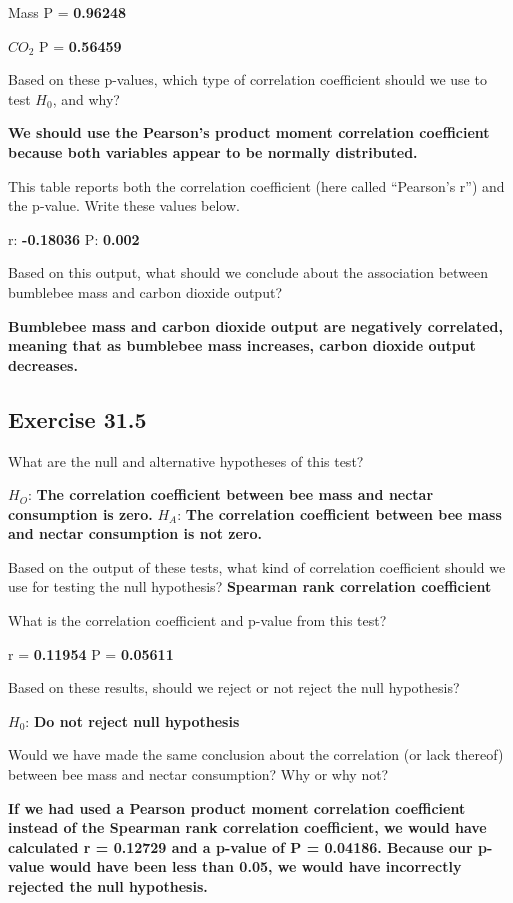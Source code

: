 \documentclass[
  openany]{scrbook}
\begin{document}
Mass P = \textbf{0.96248}

\(CO_2\) P = \textbf{0.56459}

Based on these p-values, which type of correlation coefficient should we use to test \(H_{0}\), and why?

\textbf{We should use the Pearson's product moment correlation coefficient because both variables appear to be normally distributed.}

This table reports both the correlation coefficient (here called ``Pearson's r'') and the p-value. Write these values below.

r: \textbf{-0.18036}
P: \textbf{0.002}

Based on this output, what should we conclude about the association between bumblebee mass and carbon dioxide output?

\textbf{Bumblebee mass and carbon dioxide output are negatively correlated, meaning that as bumblebee mass increases, carbon dioxide output decreases.}

\hypertarget{exercise-31.5}{%
\subsection{Exercise 31.5}\label{exercise-31.5}}

What are the null and alternative hypotheses of this test?

\(H_{O}\): \textbf{The correlation coefficient between bee mass and nectar consumption is zero.}
\(H_{A}\): \textbf{The correlation coefficient between bee mass and nectar consumption is not zero.}

Based on the output of these tests, what kind of correlation coefficient should we use for testing the null hypothesis? \textbf{Spearman rank correlation coefficient}

What is the correlation coefficient and p-value from this test?

r = \textbf{0.11954}
P = \textbf{0.05611}

Based on these results, should we reject or not reject the null hypothesis?

\(H_{0}\): \textbf{Do not reject null hypothesis}

Would we have made the same conclusion about the correlation (or lack thereof) between bee mass and nectar consumption? Why or why not?

\textbf{If we had used a Pearson product moment correlation coefficient instead of the Spearman rank correlation coefficient, we would have calculated r = 0.12729 and a p-value of P = 0.04186. Because our p-value would have been less than 0.05, we would have incorrectly rejected the null hypothesis.}
\end{document}
